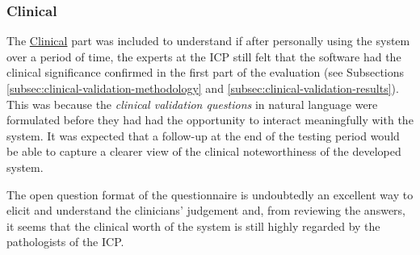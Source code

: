 \subsubsection{Clinical}
The \hyperref[ques:clinical]{Clinical} part was included to understand if after personally using the system over a period of time, the experts at the ICP still felt that the software had the clinical significance confirmed in the first part of the evaluation (see Subsections \ref{subsec:clinical-validation-methodology} and \ref{subsec:clinical-validation-results}).
This was because the \textit{clinical validation questions} in natural language were formulated before they had had the opportunity to interact meaningfully with the system.
It was expected that a follow-up at the end of the testing period would be able to capture a clearer view of the clinical noteworthiness of the developed system.

The open question format of the questionnaire is undoubtedly an excellent way to elicit and understand the clinicians' judgement and, from reviewing the answers, it seems that the clinical worth of the system is still highly regarded by the pathologists of the ICP.

